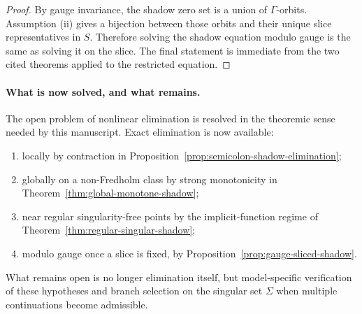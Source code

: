 \begin{proof}
By gauge invariance, the shadow zero set is a union of $\Gamma$-orbits.
Assumption (ii) gives a bijection between those orbits and their unique slice
representatives in $S$. Therefore solving the shadow equation modulo gauge is
the same as solving it on the slice. The final statement is immediate from the
two cited theorems applied to the restricted equation.
\end{proof}

\paragraph{What is now solved, and what remains.}
The open problem of nonlinear elimination is resolved in the theoremic sense
needed by this manuscript. Exact elimination is now available:
\begin{enumerate}[label=(\roman*), leftmargin=2em, itemsep=0.2em]
\item locally by contraction in Proposition~\ref{prop:semicolon-shadow-elimination};
\item globally on a non-Fredholm class by strong monotonicity in
      Theorem~\ref{thm:global-monotone-shadow};
\item near regular singularity-free points by the implicit-function regime of
      Theorem~\ref{thm:regular-singular-shadow};
\item modulo gauge once a slice is fixed, by
      Proposition~\ref{prop:gauge-sliced-shadow}.
\end{enumerate}
What remains open is no longer elimination itself, but model-specific
verification of these hypotheses and branch selection on the singular set
$\Sigma$ when multiple continuations become admissible.
